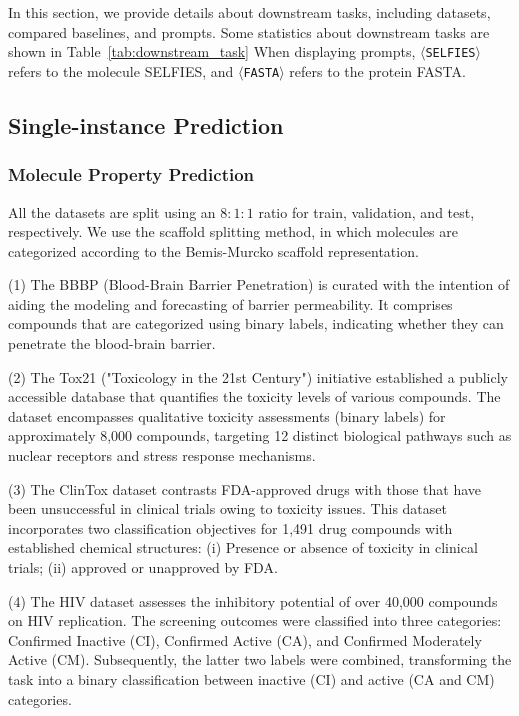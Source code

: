 \documentclass[11pt]{article}
\newcommand{\selfies}{$\langle$\texttt{SELFIES}$\rangle$}
\newcommand{\fasta}{$\langle$\texttt{FASTA}$\rangle$}
\begin{document}
In this section, we provide details about downstream tasks, including datasets, compared baselines, and prompts.
Some statistics about downstream tasks are shown in Table~\ref{tab:downstream_task}
When displaying prompts, \selfies{} refers to the molecule SELFIES, and \fasta{} refers to the protein FASTA. 

\subsection{Single-instance Prediction}
\subsubsection{Molecule Property Prediction}
All the datasets are split using an $8:1:1$ ratio for train, validation, and test, respectively.
We use the scaffold splitting method, in which molecules are categorized according to the Bemis-Murcko scaffold representation.


\noindent(1) The BBBP (Blood-Brain Barrier Penetration) is curated with the intention of aiding the modeling and forecasting of barrier permeability. It comprises compounds that are categorized using binary labels, indicating whether they can penetrate the blood-brain barrier.

\noindent(2) The Tox21 ("Toxicology in the 21st Century") initiative established a publicly accessible database that quantifies the toxicity levels of various compounds. The dataset encompasses qualitative toxicity assessments (binary labels) for approximately 8,000 compounds, targeting 12 distinct biological pathways such as nuclear receptors and stress response mechanisms.

\noindent(3) The ClinTox dataset contrasts FDA-approved drugs with those that have been unsuccessful in clinical trials owing to toxicity issues. This dataset incorporates two classification objectives for 1,491 drug compounds with established chemical structures:
(i) Presence or absence of toxicity in clinical trials; (ii) approved or unapproved by FDA.

\noindent(4) The HIV dataset assesses the inhibitory potential of over 40,000 compounds on HIV replication. The screening outcomes were classified into three categories: Confirmed Inactive (CI), Confirmed Active (CA), and Confirmed Moderately Active (CM). Subsequently, the latter two labels were combined, transforming the task into a binary classification between inactive (CI) and active (CA and CM) categories.
\end{document}
